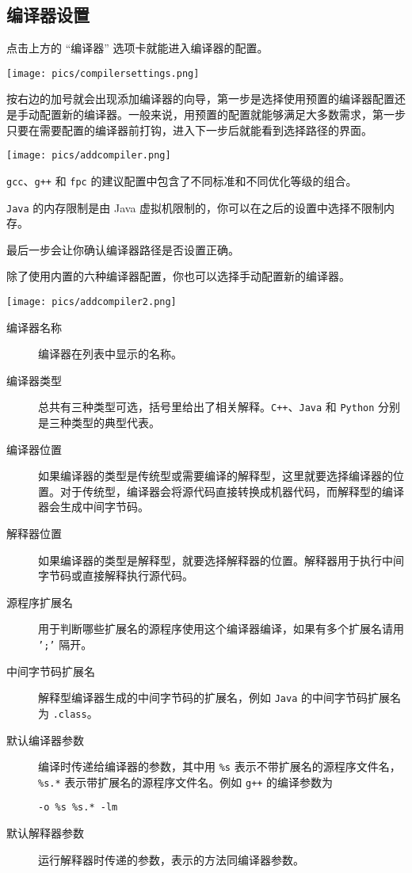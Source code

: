 \documentclass[UTF-8]{ctexart}
\begin{document}
    \subsection{编译器设置}

    点击上方的 “编译器” 选项卡就能进入编译器的配置。

    \begin{center}
        \texttt{[image: pics/compilersettings.png]}
    \end{center}

    按右边的加号就会出现添加编译器的向导，第一步是选择使用预置的编译器配置还是手动配置新的编译器。一般来说，用预置的配置就能够满足大多数需求，第一步只要在需要配置的编译器前打钩，进入下一步后就能看到选择路径的界面。

    \begin{center}
        \texttt{[image: pics/addcompiler.png]}
    \end{center}

    \texttt{gcc}、\texttt{g++} 和 \texttt{fpc} 的建议配置中包含了不同标准和不同优化等级的组合。

    \texttt{Java} 的内存限制是由 Java 虚拟机限制的，你可以在之后的设置中选择不限制内存。

    最后一步会让你确认编译器路径是否设置正确。

    除了使用内置的六种编译器配置，你也可以选择手动配置新的编译器。

    \begin{center}
        \texttt{[image: pics/addcompiler2.png]}
    \end{center}

    \begin{description}
        \item[编译器名称] 编译器在列表中显示的名称。
        \item[编译器类型] 总共有三种类型可选，括号里给出了相关解释。\texttt{C++}、\texttt{Java} 和 \texttt{Python} 分别是三种类型的典型代表。
        \item[编译器位置] 如果编译器的类型是传统型或需要编译的解释型，这里就要选择编译器的位置。对于传统型，编译器会将源代码直接转换成机器代码，而解释型的编译器会生成中间字节码。
        \item[解释器位置] 如果编译器的类型是解释型，就要选择解释器的位置。解释器用于执行中间字节码或直接解释执行源代码。
        \item[源程序扩展名] 用于判断哪些扩展名的源程序使用这个编译器编译，如果有多个扩展名请用 \texttt{';'} 隔开。
        \item[中间字节码扩展名] 解释型编译器生成的中间字节码的扩展名，例如 \texttt{Java} 的中间字节码扩展名为 \texttt{.class}。
        \item[默认编译器参数] 编译时传递给编译器的参数，其中用 \texttt{\%s} 表示不带扩展名的源程序文件名，\texttt{\%s.*} 表示带扩展名的源程序文件名。例如 \texttt{g++} 的编译参数为
        \begin{lstlisting}[frame=shadowbox,basicstyle=\ttfamily]
-o %s %s.* -lm
        \end{lstlisting}
        \item[默认解释器参数] 运行解释器时传递的参数，表示的方法同编译器参数。
    \end{description}
\end{document}
